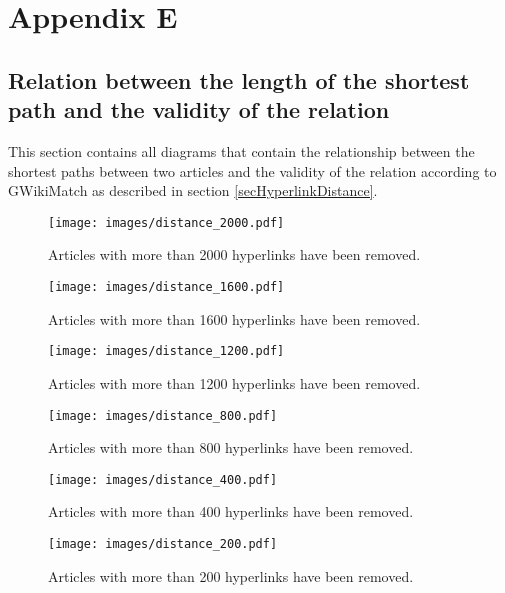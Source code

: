 \appendix

\chapter{Appendix E}
\label{appendix:scorerelation}
\section{Relation between the length of the shortest path and the validity of the relation }
This section contains all diagrams that contain the relationship between the shortest paths between two articles and the validity of the relation according to GWikiMatch as described in section \ref{secHyperlinkDistance}.

\begin{figure}[h]
\centering
\captionsetup{justification=centering}
\texttt{[image: images/distance\_2000.pdf]}
\caption{Articles with more than 2000 hyperlinks have been removed. }
\end{figure}

\begin{figure}[h]
\centering
\captionsetup{justification=centering}
\texttt{[image: images/distance\_1600.pdf]}
\caption{Articles with more than 1600 hyperlinks have been removed. }
\end{figure}

\begin{figure}[h]
\centering
\captionsetup{justification=centering}
\texttt{[image: images/distance\_1200.pdf]}
\caption{Articles with more than 1200 hyperlinks have been removed. }
\end{figure}

\begin{figure}[h]
\centering
\captionsetup{justification=centering}
\texttt{[image: images/distance\_800.pdf]}
\caption{Articles with more than 800 hyperlinks have been removed. }
\end{figure}

\begin{figure}[h]
\centering
\captionsetup{justification=centering}
\texttt{[image: images/distance\_400.pdf]}
\caption{Articles with more than 400 hyperlinks have been removed. }
\end{figure}

\begin{figure}[h]
\centering
\captionsetup{justification=centering}
\texttt{[image: images/distance\_200.pdf]}
\caption{Articles with more than 200 hyperlinks have been removed. }
\end{figure}


\appendix
